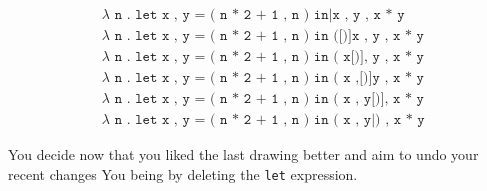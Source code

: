 \begin{align*}
  & \texttt{$\lambda$ n . let x , y = ( n * 2 + 1 , n ) in|x , y , x * y } \\
  & \texttt{$\lambda$ n . let x , y = ( n * 2 + 1 , n ) in ([)]x , y , x * y } \\
  & \texttt{$\lambda$ n . let x , y = ( n * 2 + 1 , n ) in ( x[)], y , x * y } \\
  & \texttt{$\lambda$ n . let x , y = ( n * 2 + 1 , n ) in ( x ,[)]y , x * y } \\
  & \texttt{$\lambda$ n . let x , y = ( n * 2 + 1 , n ) in ( x , y[)], x * y } \\
  & \texttt{$\lambda$ n . let x , y = ( n * 2 + 1 , n ) in ( x , y|) , x * y }
\end{align*}

You decide now that you liked the last drawing better
and aim to undo your recent changes
You being by deleting the \texttt{let} expression.







